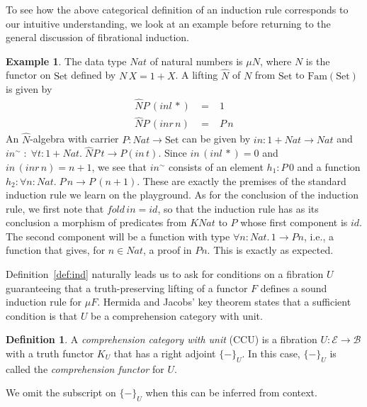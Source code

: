\documentclass{LMCS}
\newcommand{\ra}{\rightarrow}
\newcommand{\Set}{\mbox{Set}}
\newcommand{\Fam}{\mbox{Fam}}
\newcommand\E{{\mathcal E}}
\newcommand\B{{\mathcal B}}
\theoremstyle{plain}
\theoremstyle{remark}
\theoremstyle{definition}
\newtheorem{definition}[theorem]{Definition}
\newtheorem{example}[theorem]{Example}
\begin{document}
To see how the above categorical definition of an induction rule
corresponds to our intuitive understanding, we look at an example
before returning to the general discussion of fibrational induction.

\begin{example}
  The data type $\mathit{Nat}$ of natural numbers is $\mu N$, where
  $N$ is the functor on $\Set$ defined by $N\, X = 1 + X$. A lifting
  $\hat{N}$ of $N$ from $\Set$ to $\Fam(\Set)$ is given by
\[\begin{array}{lll}
\hat{N} P\, (\mathit{inl} \,*) & \;=\; & 1 \\
\hat{N} P \,(\mathit{inr} \,n) & \;=\; & P \,n  
\end{array}\]
An $\hat{N}$-algebra with carrier $P:\mathit{Nat} \rightarrow \Set$ can
be given by $\mathit{in} : 1 + \mathit{Nat} \rightarrow \mathit{Nat}$ and $in^\sim
\; : \; \forall t : 1 + \mathit{Nat}. \;\hat{N} P \,t \ra P (\mathit{in}
\,t)$.  Since $\mathit{in} \,(\mathit{inl} \, *) = 0$ and $\mathit{in}
\,(\mathit{inr} \, n) = n + 1$, we see that $in^\sim$ consists of an
element $h_1 : P \,0$ and a function $h_2 : \forall n :
\mathit{Nat}. \; P\, n \ra P\,(n+1)$.  These are exactly the premises
of the standard induction rule we learn on the playground. As for the
conclusion of the induction rule, we first note that $\mathit{fold} \,
in = id$, so that the induction rule has as its conclusion a morphism
of predicates from $K \mathit{Nat}$ to $P$ whose first component is
$\mathit{id}$. The second component will be a function with type
$\forall n : \mathit{Nat}. \,1 \ra P n$, i.e., a function that gives,
for $n \in \mathit{Nat}$, a proof in $P n$. This is exactly as expected.
\end{example}

Definition~\ref{def:ind} naturally leads us to ask for conditions on a
fibration $U$ guaranteeing that a truth-preserving lifting of a
functor $F$ defines a sound induction rule for $\mu F$. Hermida
and Jacobs' key theorem states that a sufficient condition is that $U$
be a comprehension category with unit. 

\begin{definition}
  A {\em comprehension category with unit} (CCU) is a fibration $U:\E
  \ra \B$ with a truth functor $K_U$ that has a right adjoint
  $\{-\}_U$. In this case, $\{-\}_U$ is called the {\em comprehension
    functor} for $U$.
\end{definition}
\noindent
We omit the subscript on $\{-\}_U$ when this can be inferred from
context. 
\end{document}
